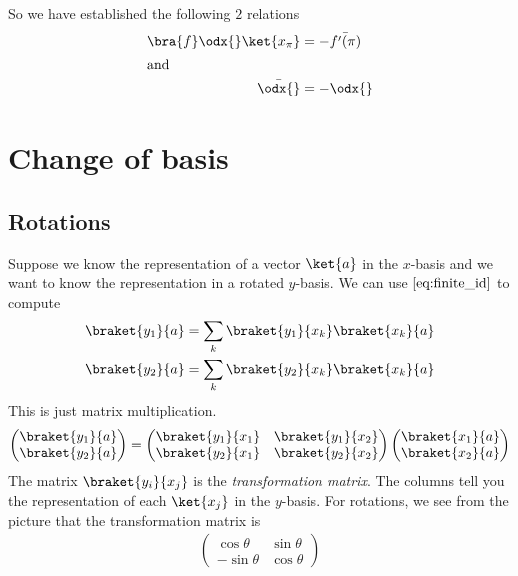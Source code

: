 \documentclass[12pt, oneside, letterpaper, fleqn]{article}
\begin{document}
So we have established the following $2$ relations
\begin{align}
\bra{f}\odx{}\ket{x_\pi} &= -\bar{f'(\pi)}\\
\intertext{and}
\bar{\odx{}} &= -\odx{}
\end{align}

\section{Change of basis}
\subsection{Rotations}
Suppose we know the representation of a vector $\ket{a}$ in the
$x$-basis and we want to know the representation in a rotated $y$-basis.
We can use $\eqref{eq:finite_id}$ to compute
\begin{align}
\braket{y_1}{a} &= \sum_k \braket{y_1}{x_k}\braket{x_k}{a}\\
\braket{y_2}{a} &= \sum_k \braket{y_2}{x_k}\braket{x_k}{a}
\end{align}
This is just matrix multiplication.
\begin{align*}
\begin{pmatrix}
\braket{y_1}{a}\\
\braket{y_2}{a}
\end{pmatrix}
=
\begin{pmatrix}
\braket{y_1}{x_1} & \braket{y_1}{x_2}\\
\braket{y_2}{x_1} & \braket{y_2}{x_2}\\
\end{pmatrix}
\begin{pmatrix}
\braket{x_1}{a}\\
\braket{x_2}{a}
\end{pmatrix}
\end{align*}
The matrix $\braket{y_i}{x_j}$ is the \emph{transformation matrix}. The
columns tell you the representation of each $\ket{x_j}$ in the
$y$-basis. For rotations, we see from the picture that the
transformation matrix is
\begin{align*}
\begin{pmatrix}
\cos\theta & \sin\theta\\
-\sin\theta & \cos\theta
\end{pmatrix}
\end{align*}
\end{document}
